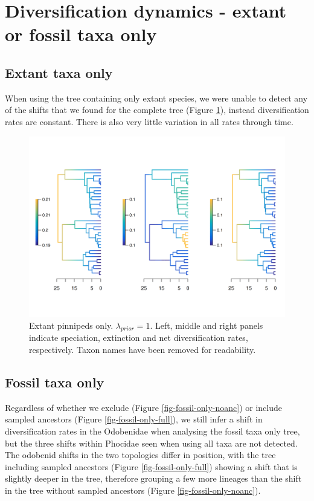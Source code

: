 \documentclass[a4paper, 12pt]{article}
\begin{document}
\section{Diversification dynamics - extant or fossil taxa only}

\subsection{Extant taxa only}

When using the tree containing only extant species, we were unable to detect any of the shifts that we found for the complete tree (Figure \ref{fig-extant-only}), instead diversification rates are constant. There is also very little variation in all rates through time.

\begin{figure}[H]
  \centering
  \includegraphics[width = \linewidth]{figures/diversification/extant-only/sensitivity-analysis-extant-only.png}
  \caption{Extant pinnipeds only. $\lambda_{prior} = 1$. Left, middle and right panels indicate speciation, extinction and net diversification rates, respectively. Taxon names have been removed  for readability.}
  \label{fig-extant-only}
\end{figure}

\subsection{Fossil taxa only}

Regardless of whether we exclude (Figure \ref{fig-fossil-only-noanc}) or include sampled ancestors (Figure \ref{fig-fossil-only-full}), we still infer a shift in diversification rates in the Odobenidae when analysing the fossil taxa only tree, but the three shifts within Phocidae seen when using all taxa are not detected. The odobenid shifts in the two topologies differ in position, with the tree including sampled ancestors (Figure \ref{fig-fossil-only-full}) showing a shift that is slightly deeper in the tree, therefore grouping a few more lineages than the shift in the tree without sampled ancestors (Figure \ref{fig-fossil-only-noanc}).
\end{document}
